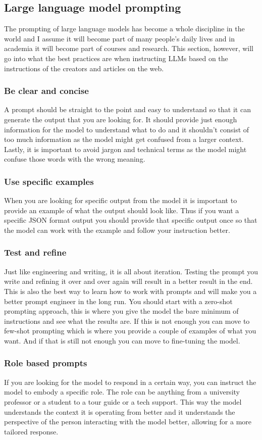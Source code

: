 \subsection{Large language model prompting}
The prompting of large language models has become a whole discipline in the world and I assume it will become part of many people's daily lives and in academia it will become part of courses and research. This section, however, will go into what the best practices are when instructing LLMs based on the instructions of the creators and articles on the web.
\subsubsection*{Be clear and concise}
A prompt should be straight to the point and easy to understand so that it can generate the output that you are looking for. It should provide just enough information for the model to understand what to do and it shouldn't consist of too much information as the model might get confused from a larger context. Lastly, it is important to avoid jargon and technical terms as the model might confuse those words with the wrong meaning.
\subsubsection*{Use specific examples}
When you are looking for specific output from the model it is important to provide an example of what the output should look like. Thus if you want a specific JSON format output you should provide that specific output once so that the model can work with the example and follow your instruction better.
\subsubsection*{Test and refine}
Just like engineering and writing, it is all about iteration. Testing the prompt you write and refining it over and over again will result in a better result in the end. This is also the best way to learn how to work with prompts and will make you a better prompt engineer in the long run. You should start with a zero-shot prompting approach, this is where you give the model the bare minimum of instructions and see what the results are. If this is not enough you can move to few-shot prompting which is where you provide a couple of examples of what you want. And if that is still not enough you can move to fine-tuning the model.
\subsubsection*{Role based prompts}
If you are looking for the model to respond in a certain way, you can instruct the model to embody a specific role. The role can be anything from a university professor or a student to a tour guide or a tech support. This way the model understands the context it is operating from better and it understands the perspective of the person interacting with the model better, allowing for a more tailored response.
